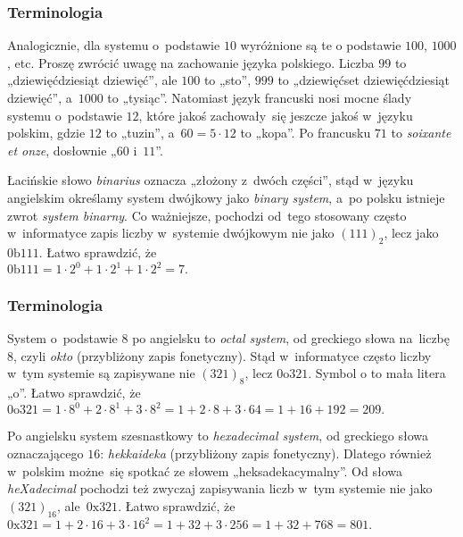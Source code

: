 \documentclass[10pt,t]{beamer}
\begin{document}
\begin{frame}
  \frametitle{Terminologia}


  Analogicznie, dla systemu o~podstawie $10$ wyróżnione są te o podstawie
  $100$, $1000$, etc. Proszę zwrócić uwagę na zachowanie języka polskiego.
  Liczba $99$ to „dziewięćdziesiąt dziewięć”, ale $100$ to „sto”,
  $999$ to „dziewięćset dziewięćdziesiąt dziewięć”, a~$1000$ to „tysiąc”.
  Natomiast język francuski nosi mocne ślady systemu o~podstawie $12$, które
  jakoś zachowały~się jeszcze jakoś w~języku polskim, gdzie $12$ to „tuzin”,
  a~$60 = 5 \cdot 12$ to „kopa”. Po francusku $71$ to \textit{soixante et onze},
  dosłownie „$60$ i~$11$”.

  Łacińskie słowo \textit{binarius} oznacza „złożony z~dwóch części”, stąd
  w~języku angielskim określamy system dwójkowy jako \textit{binary system},
  a~po polsku istnieje zwrot \textit{system binarny}. Co ważniejsze,
  pochodzi od~tego stosowany często w~informatyce zapis liczby w~systemie
  dwójkowym nie jako $(111)_{ 2 }$, lecz jako $0\text{b}111$. Łatwo
  sprawdzić, że \\
  $\displaystyle
  0\text{b}111 = 1 \cdot 2^{ 0 } + 1 \cdot 2^{ 1 } + 1 \cdot 2^{ 2 } = 7.$

\end{frame}





\begin{frame}
  \frametitle{Terminologia}


  System o~podstawie $8$ po angielsku to \textit{octal system}, od
  greckiego słowa na~liczbę $8$, czyli \textit{okto} (przybliżony zapis
  fonetyczny). Stąd w~informatyce często liczby w~tym systemie są
  zapisywane nie $(321)_{ 8 }$, lecz $0\text{o}321$. Symbol $\text{o}$ to
  mała litera „o”. Łatwo sprawdzić, że \\
  $\displaystyle
  0\text{o}321 = 1 \cdot 8^{ 0 } + 2 \cdot 8^{ 1 } + 3 \cdot 8^{ 2 } =
  1 + 2 \cdot 8 + 3 \cdot 64 = 1 + 16 + 192 = 209.$

  Po angielsku system szesnastkowy to \textit{hexadecimal system}, od
  greckiego słowa oznaczającego $16$: \textit{hekkaideka} (przybliżony
  zapis fonetyczny). Dlatego również w~polskim możne~się spotkać
  ze słowem „heksadekacymalny”. Od słowa \textit{heXadecimal} pochodzi też
  zwyczaj zapisywania liczb w~tym systemie nie jako $(321)_{ 16 }$,
  ale~$0\text{x}321$. Łatwo sprawdzić, że \\
  $0\text{x}321 = 1 + 2 \cdot 16 + 3 \cdot 16^{ 2 } = 1 + 32 + 3 \cdot 256 =
  1 + 32 + 768 = 801.$

\end{frame}
\end{document}
